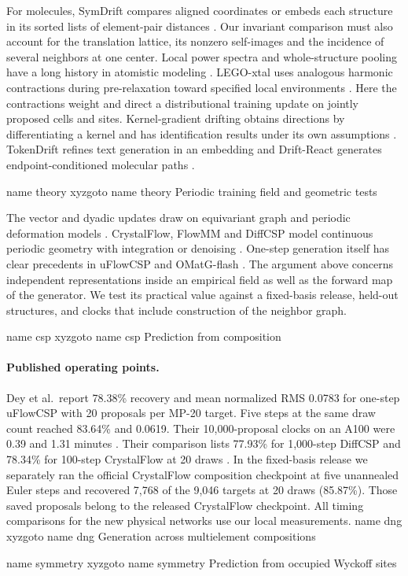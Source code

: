 \documentclass[10pt]{article}
\newcommand{\marksection}[2]{\pdfdest name {#1} xyz\pdfoutline goto name {#1} {#2}}
\begin{document}
For molecules, SymDrift compares aligned coordinates or embeds each structure in its sorted lists of element-pair distances \cite{symdrift}. Our invariant comparison must also account for the translation lattice, its nonzero self-images and the incidence of several neighbors at one center. Local power spectra and whole-structure pooling have a long history in atomistic modeling \cite{soap,whole,degenerate}. LEGO-xtal uses analogous harmonic contractions during pre-relaxation toward specified local environments \cite{lego}. Here the contractions weight and direct a distributional training update on jointly proposed cells and sites. Kernel-gradient drifting obtains directions by differentiating a kernel and has identification results under its own assumptions \cite{kernelgrad}. TokenDrift refines text generation in an embedding and Drift-React generates endpoint-conditioned molecular paths \cite{tokendrift,driftreact}.

\marksection{theory}{Periodic training field and geometric tests}

The vector and dyadic updates draw on equivariant graph and periodic deformation models \cite{egnn,gems,vector}. CrystalFlow, FlowMM and DiffCSP model continuous periodic geometry with integration or denoising \cite{crystalflow,flowmm,diffcsp}. One-step generation itself has clear precedents in uFlowCSP and OMatG-flash \cite{uflow,omatg}. The argument above concerns independent representations inside an empirical field as well as the forward map of the generator. We test its practical value against a fixed-basis release, held-out structures, and clocks that include construction of the neighbor graph.

\marksection{csp}{Prediction from composition}

\paragraph{Published operating points.}
Dey et al.\ report 78.38\% recovery and mean normalized RMS 0.0783 for one-step uFlowCSP with 20 proposals per MP-20 target. Five steps at the same draw count reached 83.64\% and 0.0619. Their 10,000-proposal clocks on an A100 were 0.39 and 1.31 minutes \cite{uflow}. Their comparison lists 77.93\% for 1,000-step DiffCSP and 78.34\% for 100-step CrystalFlow at 20 draws \cite{diffcsp,crystalflow}. In the fixed-basis release we separately ran the official CrystalFlow composition checkpoint at five unannealed Euler steps and recovered 7,768 of the 9,046 targets at 20 draws (85.87\%). Those saved proposals belong to the released CrystalFlow checkpoint. All timing comparisons for the new physical networks use our local measurements.
\marksection{dng}{Generation across multielement compositions}



\marksection{symmetry}{Prediction from occupied Wyckoff sites}

\end{document}

